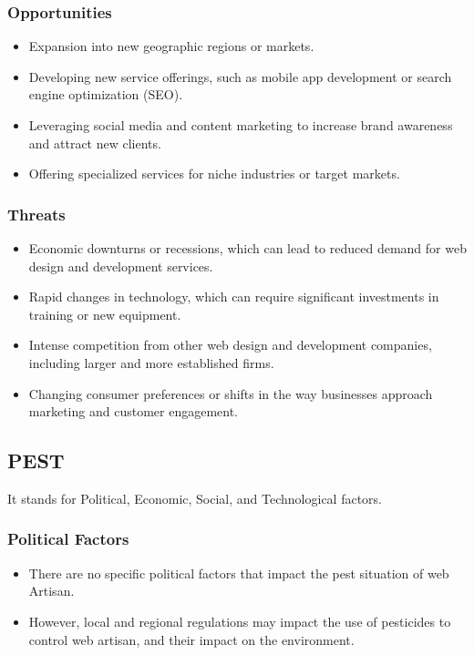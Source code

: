 \documentclass[12pt,a4paper]{article}
\begin{document}
\subsubsection{Opportunities}
\begin{itemize}
    \item Expansion into new geographic regions or markets.
    \item Developing new service offerings, such as mobile app development or search engine optimization (SEO).
    \item Leveraging social media and content marketing to increase brand awareness and attract new clients.
    \item Offering specialized services for niche industries or target markets.
\end{itemize}
\subsubsection{Threats}
\begin{itemize}
    \item Economic downturns or recessions, which can lead to reduced demand for web design and development services.
    \item Rapid changes in technology, which can require significant investments in training or new equipment.
    \item Intense competition from other web design and development companies, including larger and more established firms.
    \item Changing consumer preferences or shifts in the way businesses approach marketing and customer engagement.
\end{itemize}
\subsection{PEST}
It stands for Political, Economic, Social, and Technological factors.
\subsubsection{Political Factors}
\begin{itemize}
    \item There are no specific political factors that impact the pest situation of web Artisan.
    \item However, local and regional regulations may impact the use of pesticides to control web artisan, and their impact on the environment.    
\end{itemize}
\end{document}
